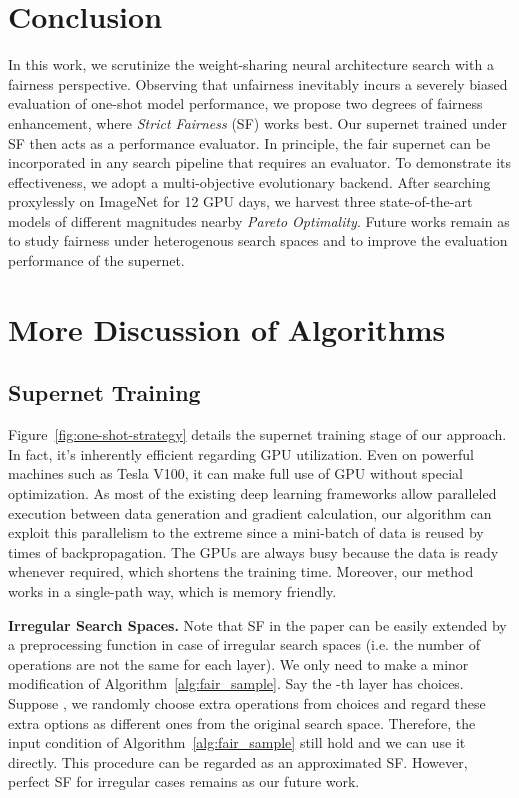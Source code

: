 \documentclass[10pt,twocolumn,letterpaper]{article}
\theoremstyle{definition}
\begin{document}
\section{Conclusion}
In this work, we scrutinize the weight-sharing neural architecture search with a fairness perspective. Observing that unfairness inevitably incurs a severely biased evaluation of one-shot model performance, we propose two degrees of fairness enhancement, where \emph{Strict Fairness} (SF) works best. Our supernet trained under SF then acts as a performance evaluator. In principle, the fair supernet can be incorporated in any search pipeline that requires an evaluator.  To demonstrate its effectiveness, we adopt a multi-objective evolutionary backend. After searching proxylessly on ImageNet for 12 GPU days, we harvest three state-of-the-art models of different magnitudes nearby \textit{Pareto Optimality}. Future works remain as to study fairness under heterogenous search spaces and to improve the evaluation performance of the supernet.  

\clearpage
{
\small


}

\newpage{}
\appendix
\section{More Discussion of Algorithms}\label{app:alg}
\subsection{Supernet Training}
Figure~\ref{fig:one-shot-strategy} details the supernet training stage of our approach. In fact, it's inherently efficient regarding GPU utilization. Even on powerful machines such as Tesla V100, it can make full use of GPU without special optimization. As most of the existing deep learning frameworks allow paralleled execution between data generation and gradient calculation, our algorithm can exploit this parallelism to the extreme since a mini-batch of data is reused by  times of backpropagation. The GPUs are always busy because the data is ready whenever required, which shortens the training time. Moreover, our method works in a single-path way, which is memory friendly.

\textbf{Irregular Search Spaces.} Note that SF in the paper can be easily extended by a preprocessing function in case of irregular search spaces (i.e. the number of operations are not the same for each layer). We only need to make a minor modification of Algorithm~\ref{alg:fair_sample}. Say the -th layer has  choices.  Suppose , we randomly choose  extra operations from  choices and regard these extra options as different ones from the original search space. Therefore, the input condition of Algorithm~\ref{alg:fair_sample} still hold and we can use it directly. This procedure can be regarded as an approximated SF.  However, perfect SF for irregular cases remains as our future work.
\end{document}
